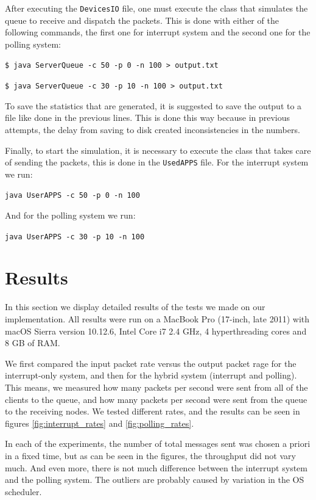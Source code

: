 \documentclass{article}
\begin{document}
After executing the \texttt{DevicesIO} file, one must execute the class that simulates the queue to receive and dispatch the packets. This is done with either of the following commands, the first one for interrupt system and the second one for the polling system:

\texttt{\$ java ServerQueue -c 50 -p 0 -n 100 > output.txt}

\texttt{\$ java ServerQueue -c 30 -p 10 -n 100 > output.txt}

To save the statistics that are generated, it is suggested to save the output to a file like done in the previous lines. This is done this way because in previous attempts, the delay from saving to disk created inconsistencies in the numbers.

Finally, to start the simulation, it is necessary to execute the class that takes care of sending the packets, this is done in the \texttt{UsedAPPS} file. For the interrupt system we run:

\texttt{java UserAPPS -c 50 -p 0 -n 100}

And for the polling system we run:

\texttt{java UserAPPS -c 30 -p 10 -n 100}

\section{Results}

In this section we display detailed results of the tests we made on our implementation. All results were run on a MacBook Pro (17-inch, late 2011) with macOS Sierra version 10.12.6, Intel Core i7 2.4 GHz, 4 hyperthreading cores and 8 GB of RAM.

We first compared the input packet rate versus the output packet rage for the interrupt-only system, and then for the hybrid system (interrupt and polling). This means, we measured how many packets per second were sent from all of the clients to the queue, and how many packets per second were sent from the queue to the receiving nodes. We tested different rates, and the results can be seen in figures \ref{fig:interrupt_rates} and \ref{fig:polling_rates}.

In each of the experiments, the number of total messages sent was chosen a priori in a fixed time, but as can be seen in the figures, the throughput did not vary much. And even more, there is not much difference between the interrupt system and the polling system. The outliers are probably caused by variation in the OS scheduler.
\end{document}
